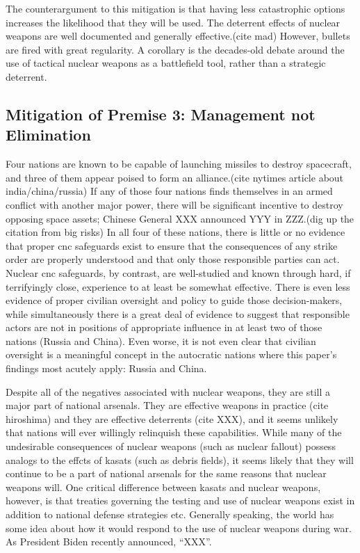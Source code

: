 The counterargument to this mitigation is that having less
catastrophic options increases the likelihood that they will be used.
The deterrent effects of nuclear weapons are well documented and
generally effective.(cite mad) However, bullets are fired with great
regularity.  A corollary is the decades-old debate around the use of
tactical nuclear weapons as a battlefield tool, rather than a
strategic deterrent.

\subsection{Mitigation of Premise 3: Management not Elimination}
Four nations are known to be capable of launching missiles to destroy
spacecraft, and three of them appear poised to form an alliance.(cite
nytimes article about india/china/russia) If any of those four nations
finds themselves in an armed conflict with another major power, there
will be significant incentive to destroy opposing space assets;
Chinese General XXX announced YYY in ZZZ.(dig up the citation from big
risks) In all four of these nations, there is little or no evidence
that proper \ac{cnc} safeguards exist to ensure that the consequences
of any strike order are properly understood and that only those
responsible parties can act.  Nuclear \ac{cnc} safeguards, by
contrast, are well-studied and known through hard, if terrifyingly
close, experience to at least be somewhat effective.\cite[ask foster
  for a recommendation]{xxx} There is even less evidence of proper
civilian oversight and policy to guide those decision-makers, while
simultaneously there is a great deal of evidence to suggest that
responsible actors are not in positions of appropriate influence in at
least two of those nations (Russia and China).  Even worse, it is not
even clear that civilian oversight is a meaningful concept in the
autocratic nations where this paper's findings most acutely apply:
Russia and China.

Despite all of the negatives associated with nuclear weapons, they are
still a major part of national arsenals.  They are effective weapons
in practice (cite hiroshima) and they are effective deterrents (cite
XXX), and it seems unlikely that nations will ever willingly
relinquish these capabilities.  While many of the undesirable
consequences of nuclear weapons (such as nuclear fallout) possess
analogs to the effcts of \acp{kasat} (such as debris fields), it seems
likely that they will continue to be a part of national arsenals for
the same reasons that nuclear weapons will.  One critical difference
between \acp{kasat} and nuclear weapons, however, is that treaties
governing the testing and use of nuclear weapons exist in addition to
national defense strategies etc.  Generally speaking, the world has
some idea about how it would respond to the use of nuclear weapons
during war.  As President Biden recently announced, ``XXX''.

